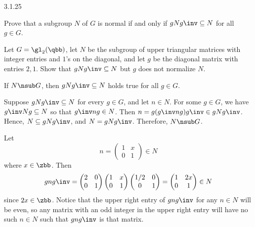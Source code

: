 \begin{exercise}{3.1.25}
    \begin{subexercises}
        \item Prove that a subgroup $N$ of $G$ is normal if and only if $gNg\inv  \subseteq N$ for all $g \in G$.
        \item Let $G = \gl_2(\qbb)$, let $N$ be the subgroup of upper triangular matrices with integer entries and $1$'s on the diagonal, and let $g$ be the diagonal matrix with entries $2,1$.
	Show that $gNg\inv  \subseteq N$ but $g$ does not normalize $N$.
    \end{subexercises}
\end{exercise}

\begin{solenum}
    \item \rightimp If $N \nsub G$, then $gNg\inv \subseteq N$ holds true for all $g \in G$.
    
    \leftimp Suppose $gNg\inv \subseteq N$ for every $g \in G$, and let $n \in N$.
	For some $g \in G$, we have $g\inv Ng \subseteq N$ so that $g\inv ng \in N$.
	Then $n = g(g\inv ng)g\inv \in gNg\inv$.
	Hence, $N \subseteq gNg\inv$, and $N = gNg\inv$.
	Therefore, $N \nsub G$.
    \item Let
    \[
    	n = 
        \begin{pmatrix}
            1 & x \\
            0 & 1
        \end{pmatrix} \in N
	\]
    where $x \in \zbb$.
	Then
    \[
    	gng\inv = 
        \begin{pmatrix}
            2 & 0 \\
            0 & 1
        \end{pmatrix}
        \begin{pmatrix}
            1 & x \\
            0 & 1
        \end{pmatrix}
        \begin{pmatrix}
            1/2 & 0 \\
            0 & 1
        \end{pmatrix} = 
        \begin{pmatrix}
            1 & 2x \\
            0 & 1
        \end{pmatrix} \in N
	\]
    since $2x \in \zbb$.
	Notice that the upper right entry of $gng\inv$ for any $n \in N$ will be even, so any matrix with an odd integer in the upper right entry will have no such $n \in N$ such that $gng\inv$ is that matrix.
\end{solenum}

